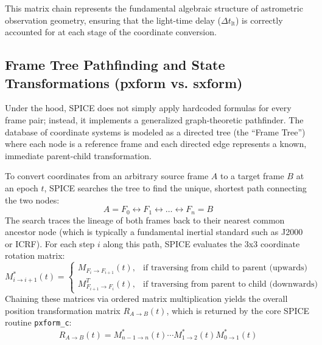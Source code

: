 \documentclass{acta}
\begin{document}
This matrix chain represents the fundamental algebraic structure of astrometric observation geometry, ensuring that the light-time delay ($\Delta t_{\text{lt}}$) is correctly accounted for at each stage of the coordinate conversion.

\subsection{Frame Tree Pathfinding and State Transformations (pxform vs. sxform)}
Under the hood, SPICE does not simply apply hardcoded formulas for every frame pair; instead, it implements a generalized graph-theoretic pathfinder. The database of coordinate systems is modeled as a directed tree (the ``Frame Tree'') where each node is a reference frame and each directed edge represents a known, immediate parent-child transformation. 

To convert coordinates from an arbitrary source frame $A$ to a target frame $B$ at an epoch $t$, SPICE searches the tree to find the unique, shortest path connecting the two nodes:
\begin{equation}
A = F_0 \longleftrightarrow F_1 \longleftrightarrow \dots \longleftrightarrow F_n = B
\end{equation}
The search traces the lineage of both frames back to their nearest common ancestor node (which is typically a fundamental inertial standard such as J2000 or ICRF). For each step $i$ along this path, SPICE evaluates the 3x3 coordinate rotation matrix:
\begin{equation}
M_{i \to i+1}^*(t) = \begin{cases} 
M_{F_i \to F_{i+1}}(t), & \text{if traversing from child to parent (upwards)} \\
M_{F_{i+1} \to F_i}^T(t), & \text{if traversing from parent to child (downwards)} 
\end{cases}
\end{equation}
Chaining these matrices via ordered matrix multiplication yields the overall position transformation matrix $R_{A \to B}(t)$, which is returned by the core SPICE routine {\tt pxform\_c}:
\begin{equation}
R_{A \to B}(t) = M_{n-1 \to n}^*(t) \cdots M_{1 \to 2}^*(t) M_{0 \to 1}^*(t)
\end{equation}
\end{document}
